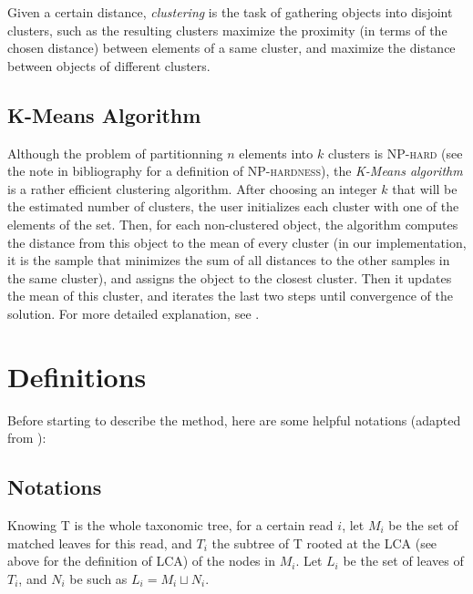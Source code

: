 \documentclass{report}
\begin{document}
Given a certain distance, \emph{clustering} is the task of gathering objects into disjoint clusters, such as the resulting clusters maximize the proximity (in terms of the chosen distance) between elements of a same cluster, and maximize the distance between objects of different clusters.

\subsection{K-Means Algorithm} 

Although the problem of partitionning $n$ elements into $k$ clusters \cite{PartitionIsNPhard} is \textsc{NP-hard}\cite{NPhard} (see the note in bibliography for a definition of \textsc{NP-hardness}), the \emph{K-Means algorithm} \cite{KMeans} is a rather efficient clustering algorithm. After choosing an integer $k$ that will be the estimated number of clusters, the user initializes each cluster with one of the elements of the set. Then, for each non-clustered object, the algorithm computes the distance from this object to the mean of every cluster (in our implementation, it is the sample that minimizes the sum of all distances to the other samples in the same cluster), and assigns the object to the closest cluster. Then it updates the mean of this cluster, and iterates the last two steps until convergence of the solution. For more detailed explanation, see \cite{KMeans}.

\section{Definitions}

Before starting to describe the method, here are some helpful notations (adapted from \cite{Tango1}):\\

\subsection{Notations}

Knowing \textsc{T} is the whole taxonomic tree, for a certain read $i$, let $M_{i}$ be the set of matched leaves for this read, and $T_{i}$ the subtree of \textsc{T} rooted at the \textsc{LCA} (see above for the definition of \textsc{LCA}) of the nodes in $M_{i}$. Let $L_{i}$ be the set of leaves of $T_{i}$, and $N_{i}$ be such as $L_{i} = M_{i} \sqcup N_{i}$.
\end{document}
